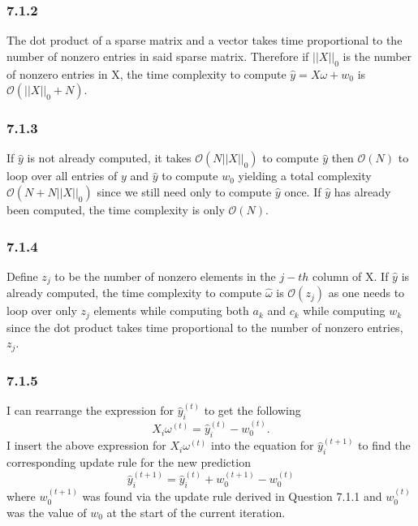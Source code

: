 \documentclass[12pt]{amsart}
\begin{document}
\subsubsection*{7.1.2}
The dot product of a sparse matrix and a vector takes time proportional to the number of nonzero entries in said sparse matrix.  Therefore if $||X||_0$ is the number of nonzero entries in X, the time complexity to compute $\hat{y} = X\omega + w_0$ is $\mathcal{O}(||X||_0 + N)$.

\subsubsection*{7.1.3}

If $\hat{y}$ is not already computed, it takes $\mathcal{O}(N ||X||_0)$ to compute $\hat{y}$ then $\mathcal{O}(N)$ to loop over all entries of $y$ and $\hat{y}$ to compute $w_0$ yielding a total complexity $\mathcal{O}(N + N||X||_0)$ since we still need only to compute $\hat{y}$ once.  If $\hat{y}$ has already been computed, the time complexity is only $\mathcal{O}(N)$. 

\subsubsection*{7.1.4}

Define $z_j$ to be the number of nonzero elements in the $j-th$ column of X.  If $\hat{y}$ is already computed, the time complexity to compute $\hat{\omega}$ is $\mathcal{O}(z_j)$ as one needs to loop over only $z_j$ elements while computing both $a_k$ and $c_k$ while computing $w_k$ since the dot product takes time proportional to the number of nonzero entries, $z_j$.

\subsubsection*{7.1.5}

I can rearrange the expression for $\hat{y}_i^{(t)}$ to get the following
\begin{equation}
X_i \omega^{(t)} = \hat{y}_i^{(t)} - w_0^{(t)}.
\end{equation}
I insert the above expression for $X_i \omega^{(t)}$ into the equation for $\hat{y}_i^{(t+1)}$ to find the corresponding update rule for the new prediction
\begin{equation}
\hat{y}_i^{(t+1)} = \hat{y}_i^{(t)} + w_0^{(t+1)} - w_0^{(t)}
\end{equation}
where $w_0^{(t+1)}$ was found via the update rule derived in Question 7.1.1 and $w_0^{(t)}$ was the value of $w_0$ at the start of the current iteration.  
\end{document}
